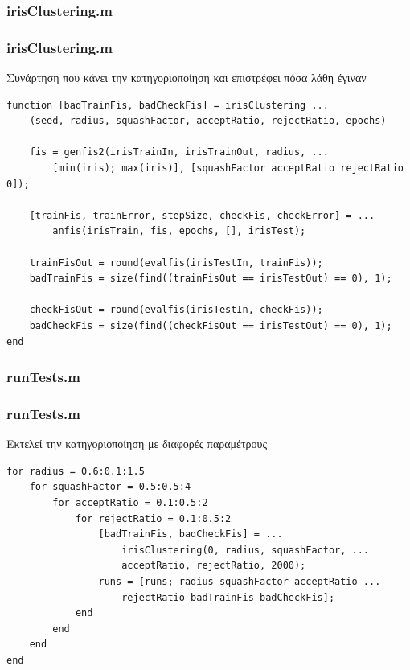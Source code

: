 \documentclass[xetex,serif,mathserif,14pt]{beamer}
\begin{document}

\subsubsection{irisClustering.m}
\begin{frame}[fragile]
\frametitle{irisClustering.m}
\small{Συνάρτηση που κάνει την κατηγοριοποίηση και επιστρέφει πόσα λάθη έγιναν}
\begin{lstlisting}
function [badTrainFis, badCheckFis] = irisClustering ...
    (seed, radius, squashFactor, acceptRatio, rejectRatio, epochs)

    fis = genfis2(irisTrainIn, irisTrainOut, radius, ...
        [min(iris); max(iris)], [squashFactor acceptRatio rejectRatio 0]);

    [trainFis, trainError, stepSize, checkFis, checkError] = ...
        anfis(irisTrain, fis, epochs, [], irisTest);

    trainFisOut = round(evalfis(irisTestIn, trainFis));
    badTrainFis = size(find((trainFisOut == irisTestOut) == 0), 1);

    checkFisOut = round(evalfis(irisTestIn, checkFis));
    badCheckFis = size(find((checkFisOut == irisTestOut) == 0), 1);
end
\end{lstlisting}
\end{frame}

\subsubsection{runTests.m}
\begin{frame}[fragile]
\frametitle{runTests.m}
Εκτελεί την κατηγοριοποίηση με διαφορές παραμέτρους
\begin{lstlisting}
for radius = 0.6:0.1:1.5
    for squashFactor = 0.5:0.5:4
        for acceptRatio = 0.1:0.5:2
            for rejectRatio = 0.1:0.5:2
                [badTrainFis, badCheckFis] = ...
                    irisClustering(0, radius, squashFactor, ...
                    acceptRatio, rejectRatio, 2000);
                runs = [runs; radius squashFactor acceptRatio ...
                    rejectRatio badTrainFis badCheckFis];
            end
        end
    end
end
\end{lstlisting}
\end{frame}
\end{document}
